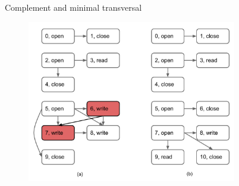 \documentclass{beamer}
\begin{document}
\begin{frame}{Complement and minimal transversal}
  \begin{figure}[p]
    \includegraphics[width=3.6in]{img/min-transversal-compl.pdf}
    \end{figure}
\end{frame}
\end{document}
